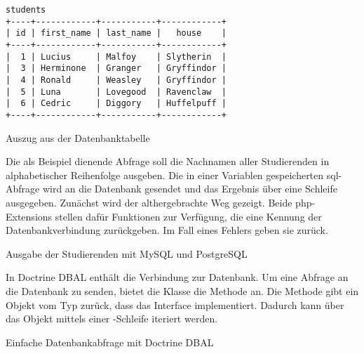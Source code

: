 \begin{table}[H]
\begin{Verbatim}[samepage=true]
students
+----+------------+-----------+------------+
| id | first_name | last_name |   house    |
+----+------------+-----------+------------+
|  1 | Lucius     | Malfoy    | Slytherin  |
|  3 | Herminone  | Granger   | Gryffindor |
|  4 | Ronald     | Weasley   | Gryffindor |
|  5 | Luna       | Lovegood  | Ravenclaw  |
|  6 | Cedric     | Diggory   | Huffelpuff |
+----+------------+-----------+------------+
\end{Verbatim}
\caption{Auszug aus der Datenbanktabelle}
\label{tab:students}
\end{table}

\newpage

Die als Beispiel dienende Abfrage soll die Nachnamen aller Studierenden in alphabetischer Reihenfolge ausgeben. Die in einer Variablen gespeicherten \gls{sql}-Abfrage wird an die Datenbank gesendet und das Ergebnis über eine Schleife ausgegeben. Zunächst wird der althergebrachte Weg gezeigt. Beide \gls{php}-Extensions stellen dafür  Funktionen zur Verfügung, die eine Kennung der Datenbankverbindung zurückgeben. Im Fall eines Fehlers geben sie  zurück.

\begin{listing}[H]
\caption{Ausgabe der Studierenden mit MySQL und PostgreSQL}
\label{lst:externalFetchAssocMethods}
\end{listing}

In Doctrine DBAL enthält  die Verbindung zur Datenbank. Um eine Abfrage an die Datenbank zu senden, bietet die Klasse die Methode  an. Die Methode gibt ein Objekt vom Typ  zurück, dass das  Interface implementiert. Dadurch kann über das Objekt mittels einer -Schleife iteriert werden.

\begin{listing}[H]
\caption{Einfache Datenbankabfrage mit Doctrine DBAL}
\label{lst:dbalSimpleQuery}
\end{listing}

